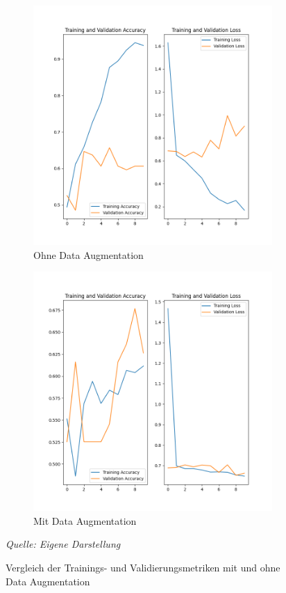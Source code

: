 \begin{figure}[H]
    \centering
    \begin{subfigure}[b]{0.49\textwidth}
        \includegraphics[width=\textwidth]{abbildungen/acc_train_val.png}
        \caption{Ohne Data Augmentation}\label{fig:metricsTrainWOAugmentation}
    \end{subfigure}
    \begin{subfigure}[b]{0.49\textwidth}
        \includegraphics[width=\textwidth]{abbildungen/loss_train_val.png}
        \caption{Mit Data Augmentation}\label{fig:metricsTrainWAugmentation}
    \end{subfigure}
    \caption{Vergleich der Trainings- und Validierungsmetriken mit und ohne Data Augmentation}\label{fig:metricsTrain}
    \textit{Quelle: Eigene Darstellung}
    \\
\end{figure}
